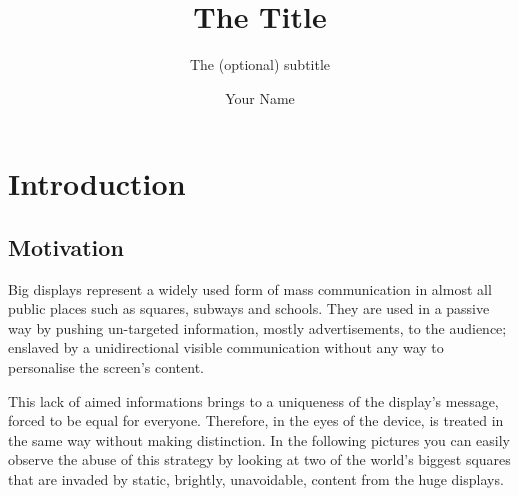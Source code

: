 \documentclass[]{usiinfbachelorproject}
\author{Your Name}
\title{The Title}
\subtitle{The (optional) subtitle}
\begin{document}
\maketitle

\section{Introduction}
\subsection{Motivation}

Big displays represent a widely used form of mass communication in almost all public places such as squares, subways and schools. They are used in a passive way by pushing un-targeted information, mostly advertisements, to the audience; enslaved by a unidirectional visible communication without any way to personalise the screen's content.

This lack of aimed informations brings to a uniqueness of the display's message, forced to be equal for everyone. Therefore, in the eyes of the device, is treated in the same way without making distinction. In the following pictures you can easily observe the abuse of this strategy by looking at two of the world's biggest squares that are invaded by static, brightly, unavoidable, content from the huge displays.
\begin{figure}[H]
  \centering
  \hfill
\end{figure} 
\end{document}
